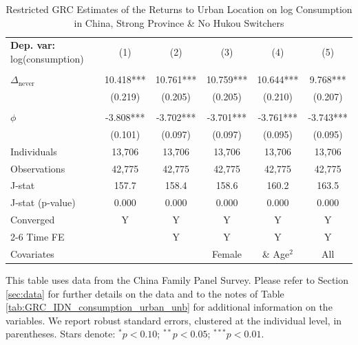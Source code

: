 \begin{table}[htbp] \centering \begin{threeparttable}
 \caption{Restricted GRC Estimates of the Returns to Urban Location on log Consumption in China, Strong Province & No Hukou Switchers} 
 \label{tab:GRC_CHN_s_same_consumption_urban_unb} 
\begin{tabular}{l ccccc} \toprule  \textbf{Dep. var:}  log(consumption) 
                    &\multicolumn{1}{c}{(1)}   &\multicolumn{1}{c}{(2)}   &\multicolumn{1}{c}{(3)}   &\multicolumn{1}{c}{(4)}   &\multicolumn{1}{c}{(5)}   \\
                    &               &               &               &               &               \\
\addlinespace
$\Delta_{\text{never}}$&      10.418***&      10.761***&      10.759***&      10.644***&       9.768***\\
                    &     (0.219)   &     (0.205)   &     (0.205)   &     (0.210)   &     (0.207)   \\
                    &               &               &               &               &               \\
\addlinespace
$\phi$              &      -3.808***&      -3.702***&      -3.701***&      -3.761***&      -3.743***\\
                    &     (0.101)   &     (0.097)   &     (0.097)   &     (0.095)   &     (0.095)   \\
\addlinespace
Individuals         &      13,706   &      13,706   &      13,706   &      13,706   &      13,706   \\
Observations        &      42,775   &      42,775   &      42,775   &      42,775   &      42,775   \\
J-stat              &       157.7   &       158.4   &       158.6   &       160.2   &       163.5   \\
J-stat (p-value)    &       0.000   &       0.000   &       0.000   &       0.000   &       0.000   \\
Converged           &           Y   &           Y   &           Y   &           Y   &           Y   \\
\cmidrule{2-6} Time FE & & Y & Y & Y & Y \\ Covariates & & & Female & \& Age$^2$ & All \\ \bottomrule \end{tabular} \begin{tablenotes}[flushleft] \footnotesize \item{This table uses data from the China Family Panel Survey. Please refer to Section \ref{sec:data} for further details on the data and to the notes of Table \ref{tab:GRC_IDN_consumption_urban_unb} for additional information on the variables. We report robust standard errors, clustered at the individual level, in parentheses. Stars denote: $^{*} p<0.10$; $^{**} p<0.05$; $^{***} p<0.01$.} \end{tablenotes} \end{threeparttable} \end{table}
